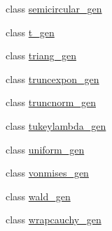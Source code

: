 \begin{DoxyCompactItemize}
\item 
class \hyperlink{classscipy_1_1stats_1_1__continuous__distns_1_1semicircular__gen}{semicircular\+\_\+gen}
\item 
class \hyperlink{classscipy_1_1stats_1_1__continuous__distns_1_1t__gen}{t\+\_\+gen}
\item 
class \hyperlink{classscipy_1_1stats_1_1__continuous__distns_1_1triang__gen}{triang\+\_\+gen}
\item 
class \hyperlink{classscipy_1_1stats_1_1__continuous__distns_1_1truncexpon__gen}{truncexpon\+\_\+gen}
\item 
class \hyperlink{classscipy_1_1stats_1_1__continuous__distns_1_1truncnorm__gen}{truncnorm\+\_\+gen}
\item 
class \hyperlink{classscipy_1_1stats_1_1__continuous__distns_1_1tukeylambda__gen}{tukeylambda\+\_\+gen}
\item 
class \hyperlink{classscipy_1_1stats_1_1__continuous__distns_1_1uniform__gen}{uniform\+\_\+gen}
\item 
class \hyperlink{classscipy_1_1stats_1_1__continuous__distns_1_1vonmises__gen}{vonmises\+\_\+gen}
\item 
class \hyperlink{classscipy_1_1stats_1_1__continuous__distns_1_1wald__gen}{wald\+\_\+gen}
\item 
class \hyperlink{classscipy_1_1stats_1_1__continuous__distns_1_1wrapcauchy__gen}{wrapcauchy\+\_\+gen}
\end{DoxyCompactItemize}
